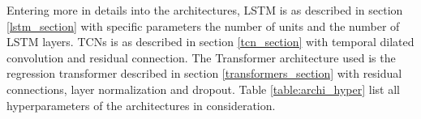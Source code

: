 \hfill \break

Entering more in details into the architectures, LSTM is as described in section \ref{lstm_section} with specific parameters the number of units and the number of LSTM layers. TCNs is as described in section \ref{tcn_section} with temporal dilated convolution and residual connection. The Transformer architecture used is the regression transformer described in section \ref{transformers_section} with residual connections, layer normalization and dropout. Table \ref{table:archi_hyper} list all hyperparameters of the architectures in consideration. 

\begin{table}[h]
\caption{Architecture hyperparameters \label{table:archi_hyper}}
\end{table}


